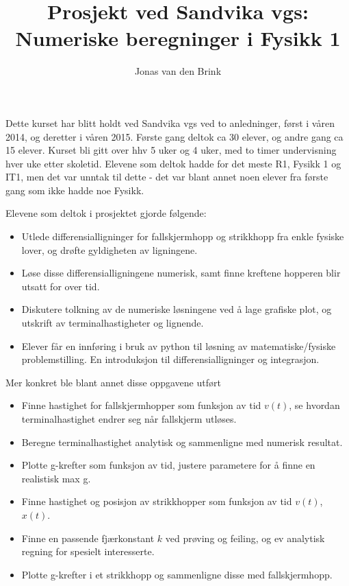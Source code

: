 \documentclass[a4paper, 11pt, notitlepage, english]{article}
\title{Prosjekt ved Sandvika vgs: \\ Numeriske beregninger i Fysikk 1}
\author{Jonas van den Brink}
\begin{document}
\maketitle

Dette kurset har blitt holdt ved Sandvika vgs ved to anledninger, først i våren 2014, og deretter i våren 2015. Første gang deltok ca 30 elever, og andre gang ca 15 elever. Kurset bli gitt over hhv 5 uker og 4 uker, med to timer undervisning hver uke etter skoletid. Elevene som deltok hadde for det meste R1, Fysikk 1 og IT1, men det var unntak til dette - det var blant annet noen elever fra første gang som ikke hadde noe Fysikk.

Elevene som deltok i prosjektet gjorde følgende:
\begin{itemize}
\item Utlede differensialligninger for fallskjermhopp og strikkhopp fra enkle fysiske lover, og drøfte gyldigheten av ligningene.
\item Løse disse differensialligningene numerisk, samt finne kreftene hopperen blir utsatt for over tid.
\item Diskutere tolkning av de numeriske løsningene ved å lage grafiske plot, og utskrift av terminalhastigheter og lignende.
\item Elever får en innføring i bruk av python til løsning av matematiske/fysiske problemstilling. En introduksjon til differensialligninger og integrasjon.
\end{itemize}

Mer konkret ble blant annet disse oppgavene utført
\begin{itemize}
 \item Finne hastighet for fallskjermhopper som funksjon av tid $v(t)$, se hvordan terminalhastighet endrer seg når fallskjerm utløses.
 \item Beregne terminalhastighet analytisk og sammenligne med numerisk resultat.
 \item Plotte g-krefter som funksjon av tid, justere parametere for å finne en realistisk max g.
 \item Finne hastighet og posisjon av strikkhopper som funksjon av tid $v(t)$, $x(t)$.
 \item Finne en passende fjærkonstant $k$ ved prøving og feiling, og ev analytisk regning for spesielt interesserte.
 \item Plotte g-krefter i et strikkhopp og sammenligne disse med fallskjermhopp.
\end{itemize}
\end{document}
